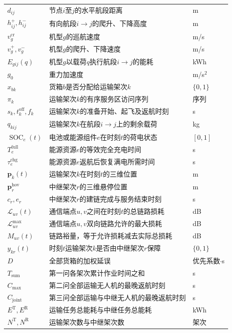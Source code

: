 \documentclass[bwprint]{gmcmthesis}
\begin{document}
\begin{longtable}{
    >{\raggedright\arraybackslash}p{2.8cm}
    >{\raggedright\arraybackslash}p{8.4cm}
    >{\raggedright\arraybackslash}p{2cm}
}
    $d_{ij}$ & 节点$i$至$j$的水平航段距离 & m \\
    $h_{ij}^{+},h_{ij}^{-}$ & 有向航段$i\to j$的爬升、下降高度 & m \\
    $v_g^{\mathrm{cr}}$ & 机型$g$的巡航速度 & m/s \\
    $v_g^{+},v_g^{-}$ & 机型$g$的爬升、下降速度 & m/s \\
    $E_{gij}(q)$ & 机型$g$以载荷$q$执行航段$i\to j$的能耗 & kWh \\
    $g_0$ & 重力加速度 & m/s$^2$ \\

    $x_{bk}$ & 货箱$b$是否分配给运输架次$k$ & $\{0,1\}$ \\
    $\pi_k$ & 运输架次$k$的有序服务区访问序列 & 序列 \\
    $s_k,t_k^{\mathrm{off}},f_k$ &
    运输架次$k$的准备开始、起飞及返航时刻 & s \\
    $q_{kij}$ & 运输架次$k$在航段$i\to j$上的剩余载荷 & kg \\
    $\operatorname{SOC}_e(t)$ &
    电池或能源组件$e$在时刻$t$的荷电状态 & $[0,1]$ \\
    $T_e^{\mathrm{full}}$ &
    能源资源$e$的等效完全充电时间 & s \\
    $\tau_e^{\mathrm{chg}}$ &
    能源资源$e$返航后恢复满电所需时间 & s \\

    $\boldsymbol{p}_k(t)$ & 运输架次$k$在时刻$t$的三维位置 & m \\
    $\boldsymbol{p}_r^{\mathrm{hov}}$ &
    中继架次$r$的三维悬停位置 & m \\
    $c_r,e_r$ & 中继架次$r$的建链完成与服务结束时刻 & s \\
    $\mathcal{L}_{uv}(t)$ &
    通信端点$u,v$之间在时刻$t$的总链路损耗 & dB \\
    $\mathcal{L}_{uv}^{\max}$ &
    通信端点$u,v$双向链路允许的最大损耗 & dB \\
    $M_{uv}(t)$ &
    链路裕量，等于允许损耗减去实际总损耗 & dB \\
    $y_{kr}(t)$ &
    时刻$t$运输架次$k$是否由中继架次$r$保障 & $\{0,1\}$ \\

    $D$ & 全部货箱的加权延误 & 优先系数$\cdot$s \\
    $T_{\mathrm{sum}}$ & 第一问各架次累计作业时间之和 & s \\
    $C_{\max}$ & 第二问全部运输无人机的最晚返航时刻 & s \\
    $C_{\mathrm{joint}}$ &
    第三问全部运输与中继无人机的最晚返航时刻 & s \\
    $E^{\mathrm{T}},E^{\mathrm{R}}$ &
    运输任务总能耗与中继任务总能耗 & kWh \\
    $N^{\mathrm{T}},N^{\mathrm{R}}$ &
    运输架次数与中继架次数 & 架次 \\


\end{longtable}
\end{document}
